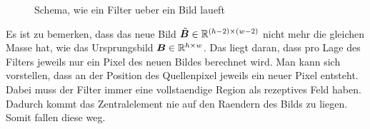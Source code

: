 \begin{figure}[h!]

  \caption{Schema, wie ein Filter ueber ein Bild laueft}
\end{figure}
\fi

Es ist zu bemerken, dass das neue Bild $\tilde{\bm{B}} \in \mathbb{R}^{(h-2) \times (w-2)}$ nicht mehr die gleichen Masse
hat, wie das Ursprungsbild $\bm{B} \in \mathbb{R}^{h \times w}$. Das liegt daran, dass pro
Lage des Filters jeweils nur ein Pixel des neuen Bildes berechnet wird. Man kann
sich vorstellen, dass an der Position des Quellenpixel jeweils ein neuer
Pixel entsteht. Dabei muss der Filter immer eine vollstaendige Region als
rezeptives Feld haben. Dadurch kommt das Zentralelement nie auf den Raendern des
Bilds zu liegen. Somit fallen diese weg.
\para{}
\cite{deeplearning.ai:cnn}
\cite{wiki:convolution}

